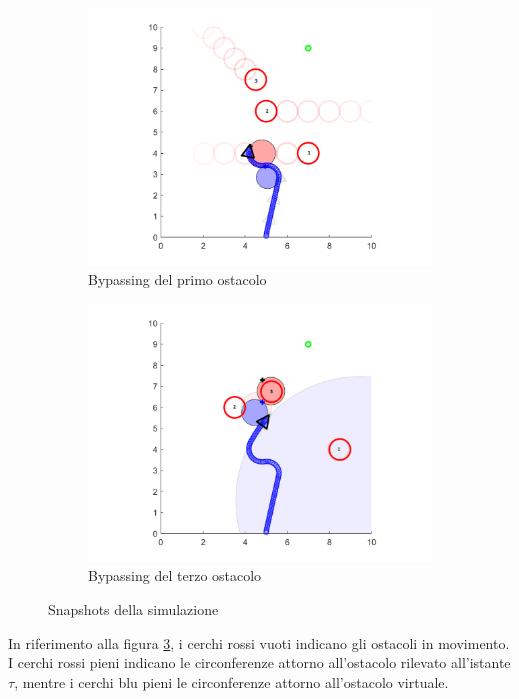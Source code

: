 \documentclass[14pt,a4paper]{extarticle}
\begin{document}
\begin{figure}[H]
\begin{subfigure}[t]{0.5\textwidth}
\centering
\caption{Bypassing del primo ostacolo}
\label{bypass1}
\includegraphics[width=\textwidth]{treobst_1.png}
\end{subfigure}
\hfill
\begin{subfigure}[t]{0.5\textwidth}
\centering
\caption{Bypassing del terzo ostacolo}
\label{bypass3}
\includegraphics[width=\textwidth]{treobst_2.png}
\end{subfigure}
\caption{Snapshots della simulazione}
\label{snapshot1}
\end{figure}
In riferimento alla figura \ref{snapshot1}, i cerchi rossi vuoti indicano gli ostacoli in movimento. I cerchi rossi pieni indicano le circonferenze attorno all'ostacolo rilevato all'istante \(\tau\), mentre i cerchi blu pieni le circonferenze attorno all'ostacolo virtuale.\\
\end{document}
